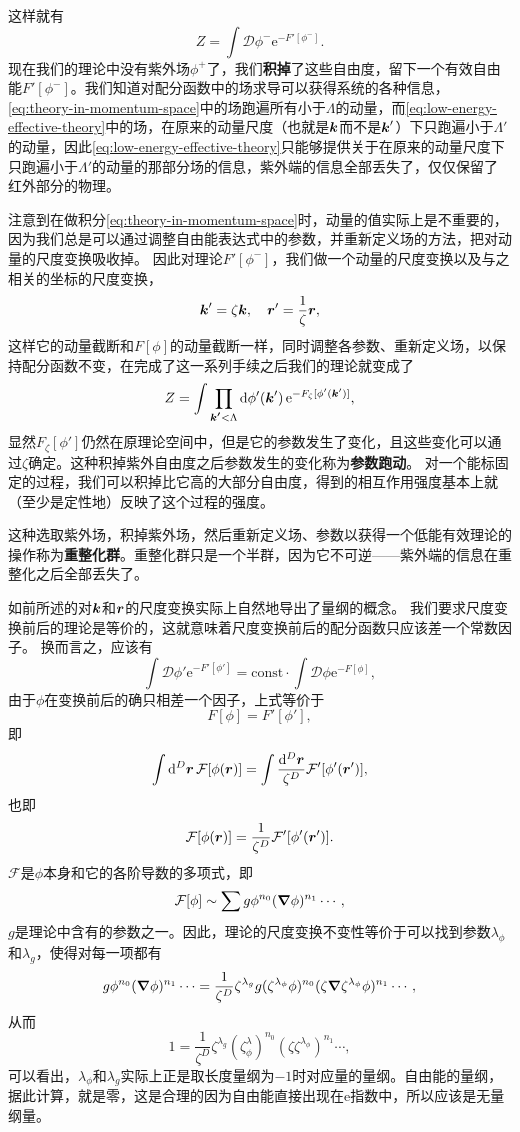 \documentclass[hyperref, UTF8, a4paper]{ctexart}
\newcommand*{\ee}{\mathrm{e}}
\newcommand*{\const}{\mathrm{const}}
\newcommand*{\fd}[1]{\mathcal{D}{#1}}
\begin{document}
这样就有
\begin{equation}
    Z = \int \fd{\phi^-} \ee^{-F'[\phi^-]}.
    \label{eq:low-energy-effective-theory}
\end{equation}
现在我们的理论中没有紫外场$\phi^+$了，我们\textbf{积掉}了这些自由度，留下一个有效自由能$F'[\phi^-]$。我们知道对配分函数中的场求导可以获得系统的各种信息，\eqref{eq:theory-in-momentum-space}中的场跑遍所有小于$\Lambda$的动量，而\eqref{eq:low-energy-effective-theory}中的场，在原来的动量尺度（也就是$\vb*{k}$而不是$\vb*{k}'$）下只跑遍小于$\Lambda'$的动量，因此\eqref{eq:low-energy-effective-theory}只能够提供关于在原来的动量尺度下只跑遍小于$\Lambda'$的动量的那部分场的信息，紫外端的信息全部丢失了，仅仅保留了红外部分的物理。

注意到在做积分\eqref{eq:theory-in-momentum-space}时，动量的值实际上是不重要的，因为我们总是可以通过调整自由能表达式中的参数，并重新定义场的方法，把对动量的尺度变换吸收掉。
因此对理论$F'[\phi^-]$，我们做一个动量的尺度变换以及与之相关的坐标的尺度变换，
\[
    \vb*{k}' = \zeta \vb*{k}, \quad \vb*{r}' = \frac{1}{\zeta} \vb*{r},
\]
这样它的动量截断和$F[\phi]$的动量截断一样，同时调整各参数、重新定义场，以保持配分函数不变，在完成了这一系列手续之后我们的理论就变成了
\[
    Z = \int \prod_{\vb*{k'} < \Lambda} \dd{\phi'(\vb*{k}')} \ee^{-F_\zeta [\phi'(\vb*{k}')]},
\]
显然$F_\zeta[\phi']$仍然在原理论空间中，但是它的参数发生了变化，且这些变化可以通过$\zeta$确定。这种积掉紫外自由度之后参数发生的变化称为\textbf{参数跑动}。
对一个能标固定的过程，我们可以积掉比它高的大部分自由度，得到的相互作用强度基本上就（至少是定性地）反映了这个过程的强度。

这种选取紫外场，积掉紫外场，然后重新定义场、参数以获得一个低能有效理论的操作称为\textbf{重整化群}。重整化群只是一个半群，因为它不可逆——紫外端的信息在重整化之后全部丢失了。

如前所述的对$\vb*{k}$和$\vb*{r}$的尺度变换实际上自然地导出了量纲的概念。
我们要求尺度变换前后的理论是等价的，这就意味着尺度变换前后的配分函数只应该差一个常数因子。
换而言之，应该有
\[
    \int \fd{\phi'} \ee^{- F'[\phi']} = \const \cdot \int \fd{\phi} \ee^{ - F[\phi]},
\]
由于$\phi$在变换前后的确只相差一个因子，上式等价于
\[
    F[\phi] = F'[\phi'],
\]
即
\[
    \int \dd[D]{\vb*{r}} \mathcal{F}[\phi(\vb*{r})] = \int \frac{\dd[D]{\vb*{r}}}{\zeta^D} \mathcal{F}' [\phi'(\vb*{r}')],
\]
也即
\[
    \mathcal{F}[\phi(\vb*{r})] = \frac{1}{\zeta^D} \mathcal{F}' [\phi'(\vb*{r}')].
\]
$\mathcal{F}$是$\phi$本身和它的各阶导数的多项式，即
\[
    \mathcal{F}[\phi] \sim \sum g \phi^{n_0} (\grad{\phi})^{n_1} \cdots,
\]
$g$是理论中含有的参数之一。因此，理论的尺度变换不变性等价于可以找到参数$\lambda_\phi$和$\lambda_g$，使得对每一项都有
\[
    g \phi^{n_0} (\grad{\phi})^{n_1} \cdots = \frac{1}{\zeta^D} \zeta^{\lambda_g} g (\zeta^{\lambda_\phi} \phi)^{n_0} (\zeta \grad{\zeta^{\lambda_\phi} \phi})^{n_1} \cdots, 
\]
从而
\[
    1 = \frac{1}{\zeta^D} \zeta^{\lambda_g} (\zeta^\lambda_\phi)^{n_0} (\zeta \zeta^{\lambda_\phi})^{n_1} \cdots,
\]
可以看出，$\lambda_\phi$和$\lambda_g$实际上正是取长度量纲为$-1$时对应量的量纲。自由能的量纲，据此计算，就是零，这是合理的因为自由能直接出现在$\ee$指数中，所以应该是无量纲量。
\end{document}
